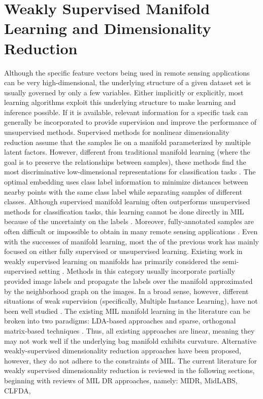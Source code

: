 \section{Weakly Supervised Manifold Learning and Dimensionality Reduction} \label{sec:weakly_sup_dim_reduction}
Although the specific feature vectors being used in remote sensing applications can be very high-dimensional, the underlying structure of a given dataset set is usually governed by only a few variables. Either implicitly or explicitly, most learning algorithms exploit this underlying structure to make learning and inference possible.
If it is available, relevant information for a specific task can generally be incorporated to provide supervision and improve the performance of unsupervised methods.  Supervised methods for nonlinear dimensionality reduction assume that the samples lie on a manifold parameterized by multiple latent factors.  However, different from traditional manifold learning (where the goal is to preserve the relationships between samples), these methods find the most discriminative low-dimensional representations for classification tasks \citep{Wu2015MILImageManifoldThesis}.  The optimal embedding uses class label information to  minimize distances between nearby points with the same class label while separating samples of different classes.  Although supervised manifold learning often outperforms unsupervised methods for classification tasks, this learning cannot be done directly in  MIL because of the uncertainty on the labels \citep{Carbonneau2016MILSurvey}.  Moreover, fully-annotated samples are often difficult or impossible to obtain in many remote sensing applications \citep{Zare2016MIACE}.  Even with the successes of manifold learning, most the of the previous work has mainly focused on either fully supervised or unsupervised learning.   Existing work in weakly supervised learning on manifolds has primarily considered the semi-supervised setting \citep{Zhang2008SpectralSemiSupManifoldLearning,Chen2018RobustSemiSupManifoldLearning,Zhang2014SemiSupManLearningFusion,Hong2019LearnableManifoldAlignment,Navaratnam2007JointManifoldSemiSupRegression,Stanley2019ManAlignmentFeatureCorrespondence,Tuia2015KernelManifoldAlignment,Wang2010MultiscaleManAlignment,Wang2011HeteroDomainAdaptationManAlignment}.  Methods in this category usually incorporate partially provided image labels and propagate the labels over the manifold approximated by the neighborhood graph on the images.  In a broad sense, however, different situations of weak supervision (specifically, Multiple Instance  Learning), have not been well studied \citep{Wu2015MILImageManifoldThesis}.  The existing MIL manifold learning in the literature can be broken into two paradigms: LDA-based approaches and sparse, orthogonal matrix-based techniques \citep{Zhu2018MIDRSparsity}. Thus, all existing approaches are linear, meaning they may not work well if the underlying bag manifold exhibits curvature.  Alternative weakly-supervised dimensionality reduction approaches have been proposed, however, they do not adhere to the constraints of MIL.  The current literature for weakly supervised dimensionality reduction is reviewed in the following sections, beginning with reviews of MIL DR approaches, namely: MIDR, MidLABS, CLFDA, 